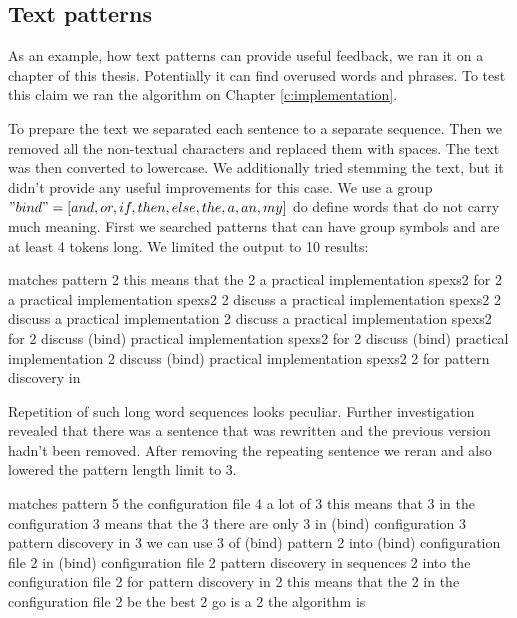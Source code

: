 \subsection{Text patterns}

As an example, how text patterns can provide useful feedback, we ran it on a chapter of this thesis. Potentially it can find overused words and phrases. To test this claim we ran the algorithm on Chapter \ref{c:implementation}. 

To prepare the text we separated each sentence to a separate sequence. Then we removed all the non-textual characters and replaced them with spaces. The text was then converted to lowercase. We additionally tried stemming the text, but it didn't provide any useful improvements for this case. We use a group $"bind" = [and, or, if, then, else, the, a, an, my]$ do define words that do not carry much meaning. First we searched patterns that can have group symbols and are at least 4 tokens long. We limited the output to 10 results:

\begin{file}
matches  pattern
2        this means that the
2        a practical implementation spexs2 for
2        a practical implementation spexs2
2        discuss a practical implementation spexs2
2        discuss a practical implementation
2        discuss a practical implementation spexs2 for
2        discuss (bind) practical implementation spexs2 for
2        discuss (bind) practical implementation
2        discuss (bind) practical implementation spexs2
2        for pattern discovery in
\end{file}

Repetition of such long word sequences looks peculiar. Further investigation revealed that there was a sentence that was rewritten and the previous version hadn't been removed. After removing the repeating sentence we reran and also lowered the pattern length limit to 3.

\begin{file}
matches  pattern
5        the configuration file
4        a lot of
3        this means that
3        in the configuration
3        means that the
3        there are only
3        in (bind) configuration
3        pattern discovery in
3        we can use
3        of (bind) pattern
2        into (bind) configuration file
2        in (bind) configuration file
2        pattern discovery in sequences
2        into the configuration file
2        for pattern discovery in
2        this means that the
2        in the configuration file
2        be the best
2        go is a
2        the algorithm is
\end{file}

